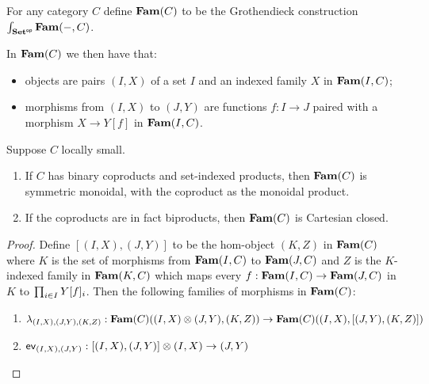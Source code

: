 \begin{definition}
For any category $C$ define $\mathbf{Fam}(C)$ to be the Grothendieck construction
$\int_{\mathbf{Set}^{\mathsf{op}}}\mathbf{Fam}(-,C)$.
\end{definition}

In $\mathbf{Fam}(C)$ we then have that:
\begin{itemize}
\item objects are pairs $(I, X)$ of a set $I$ and an indexed family $X$ in $\mathbf{Fam}(I,C)$;
\item morphisms from $(I, X)$ to $(J, Y)$ are functions $f: I \to J$ paired with a morphism $X \to Y[f]$ in
$\mathbf{Fam}(I,C)$.
\end{itemize}

\begin{proposition}
Suppose $C$ locally small.
\begin{enumerate}
\item If $C$ has binary coproducts and set-indexed products, then $\mathbf{Fam}(C)$ is symmetric monoidal, with the
coproduct as the monoidal product.
\item If the coproducts are in fact biproducts, then $\mathbf{Fam}(C)$ is Cartesian closed.
\end{enumerate}
\end{proposition}

\begin{proof}
Define $[(I, X), (J, Y)]$ to be the hom-object $(K,Z)$ in $\mathbf{Fam}(C)$ where $K$ is the set of morphisms from
$\mathbf{Fam}(I,C)$ to $\mathbf{Fam}(J,C)$ and $Z$ is the $K$-indexed family in $\mathbf{Fam}(K,C)$ which maps every $f: \mathbf{Fam}(I,C) \to
\mathbf{Fam}(J,C)$ in $K$ to $\prod_{i \in I}Y[f]_i$. Then the following families of morphisms in $\mathbf{Fam}(C)$:
\begin{enumerate}
\item $\lambda_{(I,X),(J,Y),(K,Z)}: \mathbf{Fam}(C)((I,X) \otimes (J,Y), (K,Z)) \to \mathbf{Fam}(C)((I,X), [(J,Y), (K, Z)])$
\item $\mathsf{ev}_{(I,X),(J,Y)}: [(I, X), (J, Y)] \otimes (I, X) \to (J, Y)$
\end{enumerate}
\end{proof}
